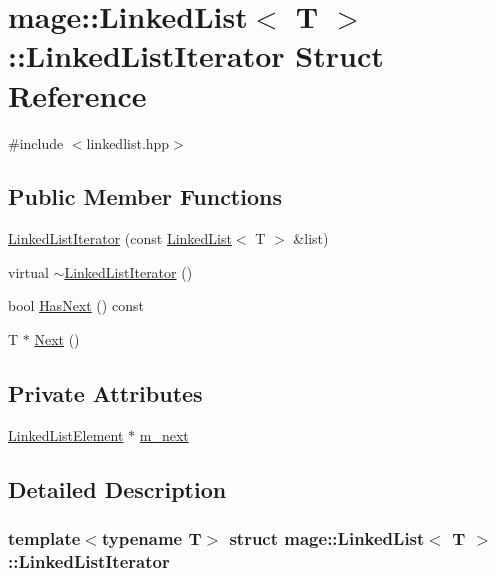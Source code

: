 \hypertarget{structmage_1_1_linked_list_1_1_linked_list_iterator}{}\section{mage\+:\+:Linked\+List$<$ T $>$\+:\+:Linked\+List\+Iterator Struct Reference}
\label{structmage_1_1_linked_list_1_1_linked_list_iterator}


{\ttfamily \#include $<$linkedlist.\+hpp$>$}

\subsection*{Public Member Functions}
\begin{DoxyCompactItemize}
\item 
\hyperlink{structmage_1_1_linked_list_1_1_linked_list_iterator_a5353da2850d87cebb02f04833061c7a0}{Linked\+List\+Iterator} (const \hyperlink{classmage_1_1_linked_list}{Linked\+List}$<$ T $>$ \&list)
\item 
virtual \hyperlink{structmage_1_1_linked_list_1_1_linked_list_iterator_a16631a6dc7aaaad10ba676f569da62b9}{$\sim$\+Linked\+List\+Iterator} ()
\item 
bool \hyperlink{structmage_1_1_linked_list_1_1_linked_list_iterator_ae23127f7be560d81bbda5321690a7ef9}{Has\+Next} () const
\item 
T $\ast$ \hyperlink{structmage_1_1_linked_list_1_1_linked_list_iterator_aaffb4ff395841103f65d09b2784ad61f}{Next} ()
\end{DoxyCompactItemize}
\subsection*{Private Attributes}
\begin{DoxyCompactItemize}
\item 
\hyperlink{structmage_1_1_linked_list_1_1_linked_list_element}{Linked\+List\+Element} $\ast$ \hyperlink{structmage_1_1_linked_list_1_1_linked_list_iterator_a2936c8e80e5ef746150a8a93ef1300cb}{m\+\_\+next}
\end{DoxyCompactItemize}


\subsection{Detailed Description}
\subsubsection*{template$<$typename T$>$\newline
struct mage\+::\+Linked\+List$<$ T $>$\+::\+Linked\+List\+Iterator}

